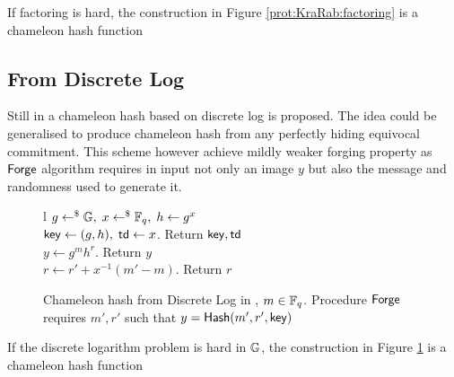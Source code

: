 \begin{proposition}
	If factoring is hard, the construction in Figure \ref{prot:KraRab:factoring} is a chameleon hash function
\end{proposition}

\subsection{From Discrete Log}
Still in \cite{NDSS:KraRab00} a chameleon hash based on discrete log is proposed. The idea could be generalised to produce chameleon hash from any perfectly hiding equivocal commitment.
This scheme however achieve mildly weaker forging property as $\mathsf{Forge}$ algorithm requires in input not only an image $y$ but also the message and randomness used to generate it.

\begin{figure}[htb]
\centering
\begin{pcarray}{l}
		{
			$g \gets^{\$} \mathbb{G}, \; x \gets^{\$} \mathbb{F}_q, \; h \gets g^x$
				\\
			$\mathsf{key} \gets (g, h), \; \mathsf{td} \gets x$. Return $\mathsf{key}, \mathsf{td}$
		}
		\\
		{
			$y \gets g^m h^r$. Return $y$
		}
		\\
		{
			$r \gets r' + x^{-1}(m' - m)$. Return $r$
		}
\end{pcarray}
\caption{Chameleon hash from Discrete Log in \cite{NDSS:KraRab00}, $m \in \mathbb{F}_q$. Procedure $\mathsf{Forge}$ requires $m', r'$ such that $y = \mathsf{Hash}(m', r', \mathsf{key})$}
\label{prot:KraRab:dlog}
\end{figure}

\begin{proposition}
	If the discrete logarithm problem is hard in $\mathbb{G}$, the construction in Figure \ref{prot:KraRab:dlog} is a chameleon hash function
\end{proposition}








